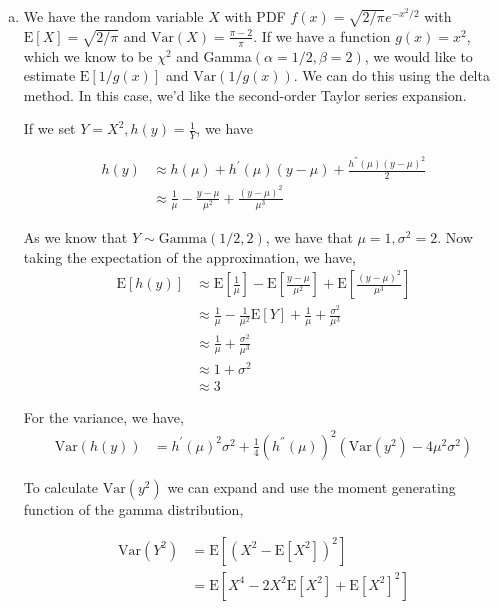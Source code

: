 \documentclass[11pt]{article}
\begin{document}
\begin{enumerate}[(a)]
  \item We have the random variable $X$ with PDF $f(x) = \sqrt{2/\pi}
    e^{-x^2/2}$ with $\mathrm{E}[X] = \sqrt{2/\pi}$ and
    $\mathrm{Var}(X) = \frac{\pi-2}{\pi}$.  If we have a function
    $g(x) = x^2$, which we know to be $\chi^2$ and
    Gamma$(\alpha=1/2,\beta=2)$, we would like to estimate
    $\mathrm{E}[1/g(x)]$ and $\mathrm{Var}(1/g(x))$.  We can do this
    using the delta method.  In this case, we'd like the second-order
    Taylor series expansion.

    If we set $Y = X^2, h(y) = \frac{1}{Y}$, we have

    \begin{align*}
      h(y) &\approx h(\mu) + h^{'}(\mu)(y-\mu) +
      \frac{h^{''}(\mu)(y-\mu)^2}{2} \\
      &\approx \frac{1}{\mu} - \frac{y-\mu}{\mu^2} +
      \frac{(y-\mu)^2}{\mu^3}
    \end{align*}

    As we know that $Y \sim \mathrm{Gamma}(1/2, 2)$, we have that $\mu
    = 1, \sigma^2 = 2$.  Now taking the expectation of the approximation, we have,
    \begin{align*}
      \mathrm{E}[h(y)] &\approx \mathrm{E}\left[ \frac{1}{\mu}
      \right]- \mathrm{E} \left[ \frac{y-\mu}{\mu^2} \right] +
      \mathrm{E} \left[ \frac{(y-\mu)^2}{\mu^3} \right] \\
      &\approx \frac{1}{\mu} - \frac{1}{\mu^2}\mathrm{E}[Y] +
      \frac{1}{\mu} + \frac{\sigma^2}{\mu^3}
      \\
      &\approx \frac{1}{\mu} + \frac{\sigma^2}{\mu^3} \\
      &\approx 1 + \sigma^2 \\
      &\approx 3
    \end{align*}

    For the variance, we have,
    \begin{align*}
      \mathrm{Var}(h(y)) &= h^{'}(\mu)^2 \sigma^2 + \frac{1}{4}(h^{''}(\mu))^2 (\mathrm{Var}(y^2)-4 \mu^2 \sigma^2)
    \end{align*}

    To calculate $\mathrm{Var}(y^2)$ we can expand and use the moment
    generating function of the gamma distribution,

    \begin{align*}
      \mathrm{Var}(Y^2) &= \mathrm{E}\left[(X^2-\mathrm{E}[X^2])^2\right] \\
      &= \mathrm{E} \left[X^4 - 2X^2 \mathrm{E}[X^2] + \mathrm{E}[X^2]^2\right] \\
    \end{align*}


\end{enumerate}
\end{document}
